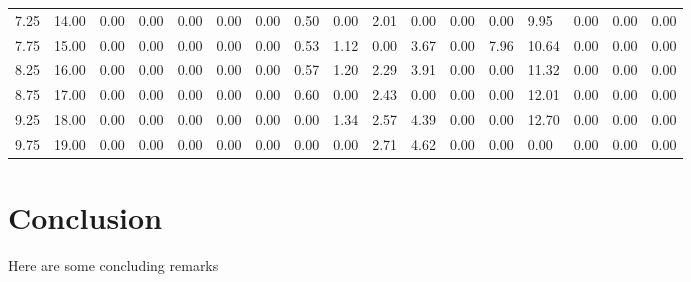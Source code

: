 \documentclass[a4paper]{article}%
\begin{document}
\begin{footnotesize}
\begin{tabular}{l|llllllllllllllll}
 7.25 & \color{red}14.00 & \color{white}0.00 & \color{white}0.00 & \color{white}0.00 & \color{white}0.00 & \color{white}0.00 & \color{green}0.50 & \color{white}0.00 & \color{yellow}2.01 & \color{white}0.00 & \color{white}0.00 & \color{white}0.00 & \color{red}9.95 & \color{white}0.00 & \color{white}0.00 & \color{white}0.00 \\
 7.75 & \color{red}15.00 & \color{white}0.00 & \color{white}0.00 & \color{white}0.00 & \color{white}0.00 & \color{white}0.00 & \color{green}0.53 & \color{yellow}1.12 & \color{white}0.00 & \color{yellow}3.67 & \color{white}0.00 & \color{red}7.96 & \color{red}10.64 & \color{white}0.00 & \color{white}0.00 & \color{white}0.00 \\
 8.25 & \color{red}16.00 & \color{white}0.00 & \color{white}0.00 & \color{white}0.00 & \color{white}0.00 & \color{white}0.00 & \color{green}0.57 & \color{yellow}1.20 & \color{yellow}2.29 & \color{yellow}3.91 & \color{white}0.00 & \color{white}0.00 & \color{red}11.32 & \color{white}0.00 & \color{white}0.00 & \color{white}0.00 \\
 8.75 & \color{red}17.00 & \color{white}0.00 & \color{white}0.00 & \color{white}0.00 & \color{white}0.00 & \color{white}0.00 & \color{green}0.60 & \color{white}0.00 & \color{yellow}2.43 & \color{white}0.00 & \color{white}0.00 & \color{white}0.00 & \color{red}12.01 & \color{white}0.00 & \color{white}0.00 & \color{white}0.00 \\
 9.25 & \color{red}18.00 & \color{white}0.00 & \color{white}0.00 & \color{white}0.00 & \color{white}0.00 & \color{white}0.00 & \color{white}0.00 & \color{yellow}1.34 & \color{yellow}2.57 & \color{yellow}4.39 & \color{white}0.00 & \color{white}0.00 & \color{red}12.70 & \color{white}0.00 & \color{white}0.00 & \color{white}0.00 \\
 9.75 & \color{red}19.00 & \color{white}0.00 & \color{white}0.00 & \color{white}0.00 & \color{white}0.00 & \color{white}0.00 & \color{white}0.00 & \color{white}0.00 & \color{yellow}2.71 & \color{red}4.62 & \color{white}0.00 & \color{white}0.00 & \color{white}0.00 & \color{white}0.00 & \color{white}0.00 & \color{white}0.00 \\
\bottomrule
\end{tabular}\end{footnotesize}

%
\section{Conclusion}%
\label{sec:Conclusion}%
Here are some concluding remarks

%
\end{document}
